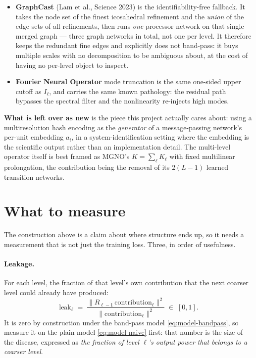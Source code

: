 \documentclass[11pt,a4paper]{article}
\begin{document}
\begin{itemize}[leftmargin=1.4em,itemsep=3pt]
\item \textbf{GraphCast} (Lam et al., Science 2023) is the identifiability-free fallback. It
takes the node set of the finest icosahedral refinement and the \emph{union} of the edge sets
of all refinements, then runs \emph{one} processor network on that single merged graph ---
three graph networks in total, not one per level. It therefore keeps the redundant fine edges
and explicitly does not band-pass: it buys multiple scales with no decomposition to be
ambiguous about, at the cost of having no per-level object to inspect.

\item \textbf{Fourier Neural Operator} mode truncation is the same one-sided upper cutoff as
$I_\ell$, and carries the same known pathology: the residual path bypasses the spectral
filter and the nonlinearity re-injects high modes.
\end{itemize}

\noindent
\textbf{What is left over as new} is the piece this project actually cares about: using a
multiresolution hash encoding as the \emph{generator} of a message-passing network's
per-unit embedding $a_i$, in a system-identification setting where the embedding is the
scientific output rather than an implementation detail. The multi-level operator itself is
best framed as MGNO's $K = \sum_\ell K_\ell$ with fixed multilinear prolongation, the
contribution being the removal of its $2(L-1)$ learned transition networks.

\section{What to measure}
\label{sec:measure}

The construction above is a claim about where structure ends up, so it needs a measurement
that is not just the training loss. Three, in order of usefulness.

\paragraph{Leakage.} For each level, the fraction of that level's own contribution that the
next coarser level could already have produced:
\begin{equation}
\mathrm{leak}_\ell \;=\;
\frac{\big\| R_{\ell-1}\, \mathrm{contribution}_\ell \big\|^2}
     {\big\| \mathrm{contribution}_\ell \big\|^2}
\;\in\; [0,1] .
\label{eq:leak}
\end{equation}
It is zero by construction under the band-pass model \eqref{eq:model-bandpass}, so measure
it on the plain model \eqref{eq:model-naive} first: that number is the size of the disease,
expressed as \emph{the fraction of level $\ell$'s output power that belongs to a coarser
level}.
\end{document}

